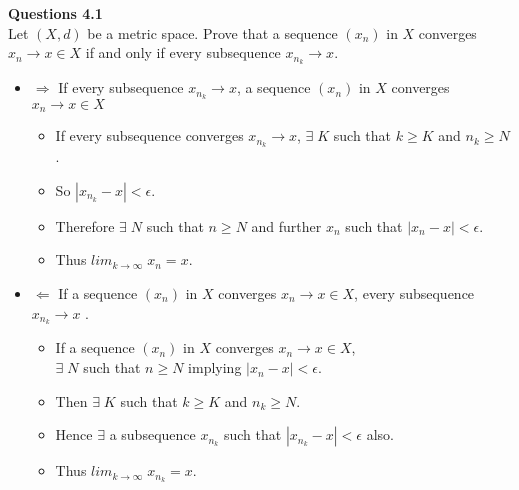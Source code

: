 \documentclass[12pt]{article}
\begin{document}



\textbf{Questions 4.1}\\
Let $(X,d)$ be a metric space. Prove that a sequence $(x_n)$ in $X$ converges $x_n \rightarrow x \in X$ if and only if every subsequence $x_{n_k} \rightarrow x.$

\begin{itemize}
    \item $\Rightarrow$ If every subsequence $x_{n_k} \rightarrow x$, a sequence $(x_n)$ in $X$ converges $x_n \rightarrow x \in X$ 
    \begin{itemize}
        \item If every subsequence converges $x_{n_k} \rightarrow x$, $\exists\; K$ such that $k\ge K$ and $n_k \ge N$.  
        
        \item So $|x_{n_k} - x| < \epsilon$.
        
        \item Therefore $\exists\; N $ such that $n\ge N$ and further $x_n$ such that $|x_n - x| <\epsilon$.
        
        \item Thus $lim_{k\rightarrow \infty} \; x_{n} = x$.
    \end{itemize}
    
    \item $\Leftarrow$ If a sequence $(x_n)$ in $X$ converges $x_n \rightarrow x \in X$, every subsequence $x_{n_k} \rightarrow x$ .
    \begin{itemize}
        \item If a sequence $(x_n)$ in $X$ converges $x_n \rightarrow x \in X$,\\ $\exists\; N$ such that $n\ge N$ implying $|x_n - x| < \epsilon$.
        
        \item Then $\exists\; K$ such that $k\ge K$ and $n_k \ge N$. 
        
        \item Hence $\exists$ a subsequence $x_{n_k}$ such that $|x_{n_k} - x| < \epsilon$ also.
        
        \item Thus $lim_{k\rightarrow \infty} \; x_{n_k} = x$.
    \end{itemize}
    
\end{itemize}
\end{document}

